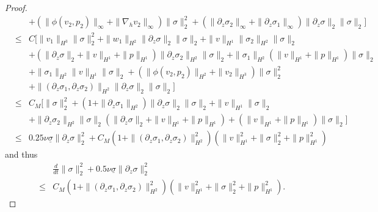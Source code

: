 \documentclass[12pt,reqno]{amsart}
\numberwithin{equation}{section}
\begin{document}
\begin{proof}
\begin{eqnarray*}
     &&+(\|\phi(v_2,p_2)\|_\infty+\|\nabla_hv_2\|_\infty)\|\sigma\|_2^2+(\|\partial_z\sigma_2\|_\infty+\|\partial_z\sigma_1\|_\infty)
     \|\partial_z\sigma\|_2\|\sigma\|_2]\\
     &\leq&C[\|v_1\|_{H^3}\|\sigma\|_2^2+\|w_1\|_{H^2}\|\partial_z\sigma\|_2\|\sigma\|_2+\|v\|_{H^1}\|\sigma_2\|_{H^2}\|\sigma\|_2\\
     &&+(\|\partial_z\sigma\|_2+\|v\|_{H^1}+\|p\|_{H^1})\|\partial_z\sigma_2\|_{H^2}\|\sigma\|_2+\|\sigma_1\|_{H^2}
     (\|v\|_{H^1}+\|p\|_{H^1})\|\sigma\|_2\\
     &&+\|\sigma_1\|_{H^2}\|v\|_{H^1}\|\sigma\|_2+(\|\phi(v_2,p_2)\|_{H^2}+\|v_2\|_{H^3})\|\sigma\|_2^2\\
     &&+\|(\partial_z\sigma_1,\partial_z\sigma_2)\|_{H^2}\|\partial_z\sigma\|_2\|\sigma\|_2]\\
     &\leq&C_M[\|\sigma\|_2^2+(1+\|\partial_z\sigma_1\|_{H^2})\|\partial_z\sigma\|_2\|\sigma\|_2+\|v\|_{H^1}\|\sigma\|_2\\
     &&+\|\partial_z\sigma_2\|_{H^2}\|\sigma\|_2(\|\partial_z\sigma\|_2+\|v\|_{H^1}+\|p\|_{H^1})+(\|v\|_{H^1}+\|p\|_{H^1})\|\sigma\|_2]\\
     &\leq&0.25\nu\underline\sigma\|\partial_z\sigma\|_2^2+C_{M}(1+\|(\partial_z\sigma_1,\partial_z\sigma_2)\|_{H^2}^2)
     (\|v\|_{H^1}^2+\|\sigma\|_2^2+\|p\|_{H^1}^2)
  \end{eqnarray*}
  and thus
  \begin{eqnarray}
     &&\frac{d}{dt}\|\sigma\|_2^2+0.5\nu\underline\sigma\|\partial_z\sigma\|_2^2\nonumber\\
     &\leq&C_{M}(1+\|(\partial_z\sigma_1,\partial_z\sigma_2)\|_{H^2}^2)
     (\|v\|_{H^1}^2+\|\sigma\|_2^2+\|p\|_{H^1}^2). \label{922-8}
  \end{eqnarray}


\end{proof}
\end{document}

